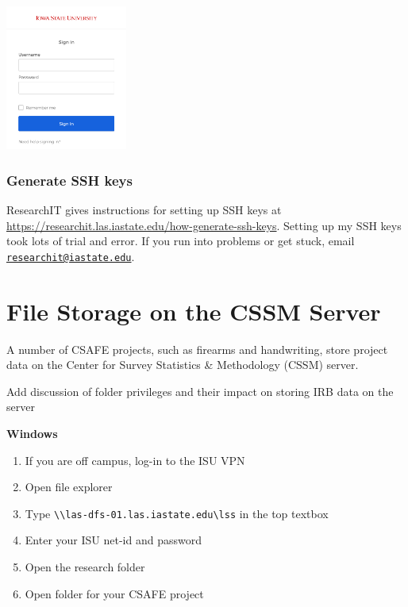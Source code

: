 \documentclass[
]{book}
\providecommand{\tightlist}{%
  \setlength{\itemsep}{0pt}\setlength{\parskip}{0pt}}
\begin{document}
\begin{enumerate}
  \includegraphics[width=0.3\textwidth,height=0.3\textheight]{images/isu_login.png}
\end{enumerate}

\hypertarget{ssh-keys}{%
\subsection{Generate SSH keys}\label{ssh-keys}}

ResearchIT gives instructions for setting up SSH keys at \url{https://researchit.las.iastate.edu/how-generate-ssh-keys}. Setting up my SSH keys took lots of trial and error. If you run into problems or get stuck, email \href{mailto:researchit@iastate.edu}{\nolinkurl{researchit@iastate.edu}}.

\hypertarget{file-storage-on-the-cssm-server}{%
\chapter{File Storage on the CSSM Server}\label{file-storage-on-the-cssm-server}}

A number of CSAFE projects, such as firearms and handwriting, store project data on the Center for Survey Statistics \& Methodology (CSSM) server.

Add discussion of folder privileges and their impact on storing IRB data on the server

\textbf{Windows}

\begin{enumerate}
\def\labelenumi{\arabic{enumi}.}
\tightlist
\item
  If you are off campus, log-in to the ISU VPN
\item
  Open file explorer
\item
  Type \texttt{\textbackslash{}\textbackslash{}las-dfs-01.las.iastate.edu\textbackslash{}lss} in the top textbox
\item
  Enter your ISU net-id and password
\item
  Open the research folder
\item
  Open folder for your CSAFE project
\end{enumerate}
\end{document}
